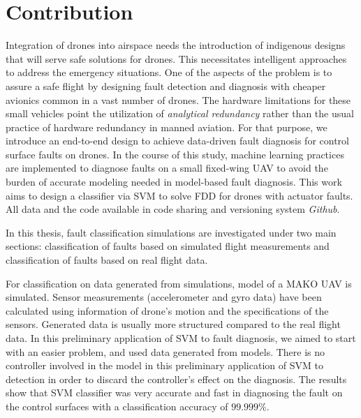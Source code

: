\section{Contribution}

Integration of drones into airspace needs the introduction of indigenous designs that will serve safe solutions for drones. This necessitates intelligent approaches to address the emergency situations. One of the aspects of the problem is to assure a safe flight by designing fault detection and diagnosis with cheaper avionics common in a vast number of drones.
The hardware limitations for these small vehicles point the utilization of \emph{analytical redundancy} rather than the usual practice of hardware redundancy in manned aviation. 
For that purpose, we introduce an end-to-end design to achieve data-driven fault diagnosis for control surface faults on drones.
In the course of this study, machine learning practices are implemented to diagnose faults on a small fixed-wing UAV to avoid the burden of accurate modeling needed in model-based fault diagnosis. 
This work aims to design a classifier via SVM to solve FDD for drones with actuator faults.
All data and the code available in code sharing and versioning system \emph{Github}. 

In this thesis, fault classification simulations are investigated under two main sections: classification of faults based on simulated flight measurements and classification of faults based on real flight data. 

For classification on data generated from simulations, model of a MAKO UAV is simulated.
Sensor measurements (accelerometer and gyro data) have been calculated using information of drone's motion and the specifications of the sensors. 
Generated data is usually more structured compared to the real flight data. 
In this preliminary application of SVM to fault diagnosis, we aimed to start with an easier problem, and used data generated from models.
There is no controller involved in the model in this preliminary application of SVM to detection in order to discard the controller's effect on the diagnosis. 
The results show that SVM classifier was very accurate and fast in diagnosing the fault on the control surfaces with a classification accuracy of $99.999\%$.

